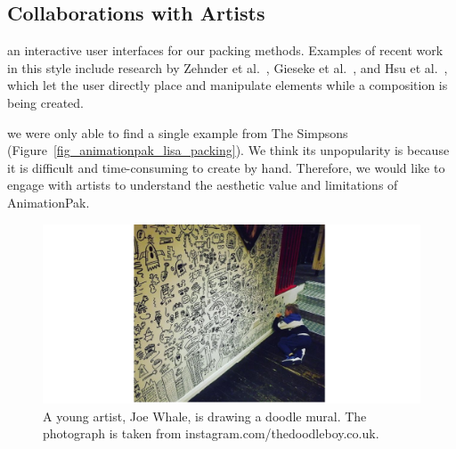 \subsection{Collaborations with Artists}





 an interactive user interfaces for our packing methods.
Examples of recent work in this style include research
by Zehnder et al.~\cite{Zehnder2016}, Gieseke et al.~\cite{Gieseke2017}, 
and Hsu et al.~\cite{Hsu2020}, which let the user directly place and manipulate
elements while a composition is being created.

we were only able to find a single example from The Simpsons (Figure~\ref{fig_animationpak_lisa_packing}). 
We think its unpopularity is because it is difficult and time-consuming to create by hand.
Therefore, we would like to engage with artists to understand the aesthetic value and limitations
of AnimationPak.

\begin{figure}
\centering
\includegraphics[width=1.0\textwidth]{figures/conclusions/doodle_boy.pdf}
\caption[A doodle mural by Joe Whale]
{ \label{doodle_boy} 
\nnewtext
{
A young artist, Joe Whale, is drawing a doodle mural. 
The photograph is taken from instagram.com/thedoodleboy.co.uk.
}
}
\end{figure}

